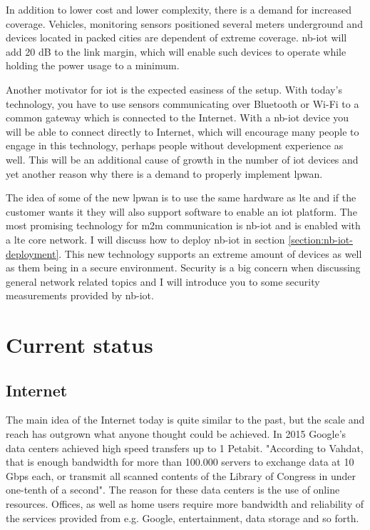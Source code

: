 \documentclass[USenglish]{ifimaster}  %
\begin{document}
In addition to lower cost and lower complexity, there is a demand for increased coverage. Vehicles, monitoring sensors positioned several meters underground and devices located in packed cities are dependent of extreme coverage. \acrshort{nb-iot} will add 20 dB to the link margin, which will enable such devices to operate while holding the power usage to a minimum.

Another motivator for \acrshort{iot} is the expected easiness of the setup. With today's technology, you have to use sensors communicating over Bluetooth or Wi-Fi to a common gateway which is connected to the Internet. With a \acrshort{nb-iot} device you will be able to connect directly to Internet, which will encourage many people to engage in this technology, perhaps people without development experience as well. This will be an additional cause of growth in the number of \acrshort{iot} devices and yet another reason why there is a demand to properly implement \acrshort{lpwan}.

The idea of some of the new \acrshort{lpwan} is to use the same hardware as \acrshort{lte} and if the customer wants it they will also support software to enable an \acrshort{iot} platform. The most promising technology for \acrshort{m2m} communication is \acrshort{nb-iot} and is enabled with a \acrshort{lte} core network. I will discuss how to deploy \acrshort{nb-iot} in section \vref{section:nb-iot-deployment}. This new technology supports an extreme amount of devices as well as them being in a secure environment. Security is a big concern when discussing general network related topics and I will introduce you to some security measurements provided by \acrshort{nb-iot}.

\section{Current status}
\subsection{Internet}
The main idea of the Internet today is quite similar to the past, but the scale and reach has outgrown what anyone thought could be achieved. In 2015 Google's data centers achieved high speed transfers up to 1 Petabit. "According to Vahdat, that is enough bandwidth for more than 100.000 servers to exchange data at 10 Gbps each, or transmit all scanned contents of the Library of Congress in under one-tenth of a second"\cite{online:petabitGoogle}. The reason for these data centers is the use of online resources. Offices, as well as home users require more bandwidth and reliability of the services provided from e.g. Google, entertainment, data storage and so forth.
\end{document}
